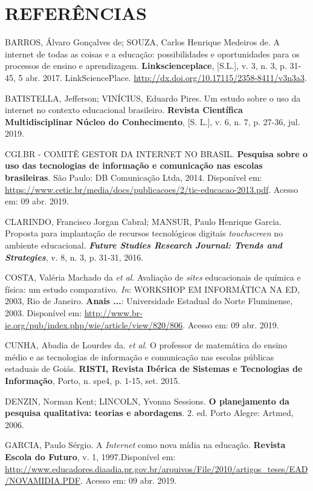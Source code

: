 \documentclass{IFNMG}
\begin{document}
\section{REFERÊNCIAS}
	\begin{Referencias}
	
	BARROS, Álvaro Gonçalves de; SOUZA, Carlos Henrique Medeiros de. A internet de todas as coisas e a educação: possibilidades e oportunidades para os processos de ensino e aprendizagem. \textbf{Linkscienceplace}, [S.L.], v. 3, n. 3, p. 31-45, 5 abr. 2017. LinkSciencePlace. \url{http://dx.doi.org/10.17115/2358-8411/v3n3a3}.
		
	BATISTELLA, Jefferson; VINÍCIUS, Eduardo Pires. Um estudo sobre o uso da internet no contexto educacional brasileiro. \textbf{Revista Científica Multidisciplinar Núcleo do Conhecimento}, [S. L.], v. 6, n. 7, p. 27-36, jul. 2019.
		
	
		
	CGI.BR - COMITÊ GESTOR DA INTERNET NO BRASIL. \textbf{Pesquisa sobre o uso das tecnologias de informação e comunicação nas escolas brasileiras}. São Paulo: DB Comunicação Ltda, 2014. Disponível em: \url{https://www.cetic.br/media/docs/publicacoes/2/tic-educacao-2013.pdf}. Acesso em: 09 abr. 2019.
	
	CLARINDO, Francisco Jorgan Cabral; MANSUR, Paulo Henrique Garcia. Proposta para implantação de recursos tecnológicos digitais \textit{touchscreen} no ambiente educacional. \textit{\textbf{Future Studies Research Journal: Trends and Strategies}}, v. 8, n. 3, p. 31-31, 2016.
	
	COSTA, Valéria Machado da \textit{et al}. Avaliação de \textit{sites} educacionais de química e física: um estudo comparativo. \textit{In}: WORKSHOP EM INFORMÁTICA NA ED, 2003, Rio de Janeiro. \textbf{Anais ...}: Universidade Estadual do Norte Fluminense, 2003. Disponível em: \url{http://www.br-ie.org/pub/index.php/wie/article/view/820/806}. Acesso em: 09 abr. 2019.
	
	CUNHA, Abadia de Lourdes da. \textit{et al}. O professor de matemática do ensino médio e as tecnologias de informação e comunicação nas escolas públicas estaduais de Goiás. \textbf{RISTI, Revista Ibérica de Sistemas e Tecnologias de Informação}, Porto, n. spe4, p. 1-15, set. 2015.
	
	DENZIN, Norman Kent; LINCOLN, Yvonna Sessions. \textbf{O planejamento da pesquisa qualitativa: teorias e abordagens}. 2. ed. Porto Alegre: Artmed, 2006.
	
	GARCIA, Paulo Sérgio. A \textit{Internet} como nova mídia na educação. \textbf{Revista Escola do Futuro}, v. 1, 1997.Disponível em: \url{http://www.educadores.diaadia.pr.gov.br/arquivos/File/2010/artigos_teses/EAD/NOVAMIDIA.PDF}. Acesso em: 09 abr. 2019.
	

\end{Referencias}
\end{document}
